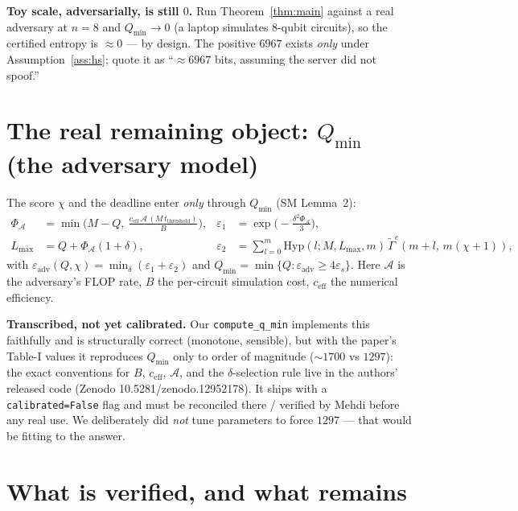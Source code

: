 \documentclass[11pt]{article}
\theoremstyle{definition}
\theoremstyle{plain}
\newcommand{\epss}{\varepsilon_{s}}
\newcommand{\Qmin}{Q_{\min}}
\begin{document}
\begin{warnbox}
\textbf{Toy scale, adversarially, is still $0$.} Run Theorem~\ref{thm:main} against a real adversary
at $n=8$ and $\Qmin\to 0$ (a laptop simulates $8$-qubit circuits), so the certified entropy is
$\approx 0$ --- by design. The positive $6967$ exists \emph{only} under Assumption~\ref{ass:hs};
quote it as ``$\approx 6967$ bits, assuming the server did not spoof.''
\end{warnbox}

\section{The real remaining object: $\Qmin$ (the adversary model)}

The score $\chi$ and the deadline enter \emph{only} through $\Qmin$ (SM Lemma~2):
\begin{align*}
\Phi_{\mathcal A} &= \min\!\Big(M-Q,\ \tfrac{c_{\mathrm{eff}}\,\mathcal A\,(M\,t_{\mathrm{threshold}})}{B}\Big), &
\varepsilon_1 &= \exp\!\big(-\tfrac{\delta^2 \Phi_{\mathcal A}}{3}\big), \\
L_{\max} &= Q + \Phi_{\mathcal A}(1+\delta), &
\varepsilon_2 &= \!\sum_{l=0}^{m}\! \mathrm{Hyp}(l;M,L_{\max},m)\,\widetilde\Gamma^{c}(m{+}l,\,m(\chi{+}1)),
\end{align*}
with $\varepsilon_{\mathrm{adv}}(Q,\chi)=\min_\delta(\varepsilon_1+\varepsilon_2)$ and
$\Qmin=\min\{Q:\varepsilon_{\mathrm{adv}}\ge4\epss\}$. Here $\mathcal A$ is the adversary's FLOP rate,
$B$ the per-circuit simulation cost, $c_{\mathrm{eff}}$ the numerical efficiency.

\begin{warnbox}
\textbf{Transcribed, not yet calibrated.} Our \texttt{compute\_q\_min} implements this faithfully
and is structurally correct (monotone, sensible), but with the paper's Table-I values it reproduces
$\Qmin$ only to order of magnitude ($\sim1700$ vs $1297$): the exact conventions for $B$,
$c_{\mathrm{eff}}$, $\mathcal A$, and the $\delta$-selection rule live in the authors' released code
(Zenodo 10.5281/zenodo.12952178). It ships with a \texttt{calibrated=False} flag and must be
reconciled there / verified by Mehdi before any real use. We deliberately did \emph{not} tune
parameters to force $1297$ --- that would be fitting to the answer.
\end{warnbox}

\section{What is verified, and what remains}
\end{document}
